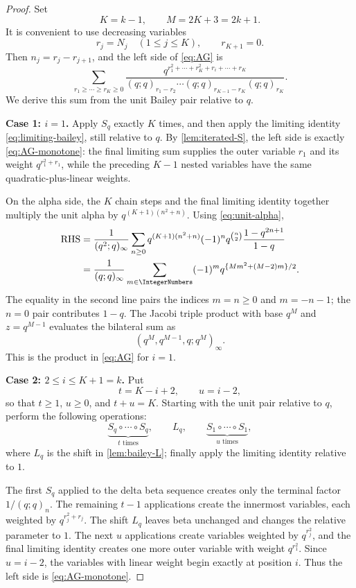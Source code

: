 \documentclass[11pt]{article}
\theoremstyle{blueplain}
\theoremstyle{bluedef}
\begin{document}
\begin{proof}
Set
\[
K=k-1,
\qquad M=2K+3=2k+1.
\]
It is convenient to use decreasing variables
\[
r_j=N_j\quad(1\le j\le K),
\qquad r_{K+1}=0.
\]
Then $n_j=r_j-r_{j+1}$, and the left side of \eqref{eq:AG} is
\begin{equation}\label{eq:AG-monotone}
\sum_{r_1\ge\cdots\ge r_K\ge0}
\frac{q^{r_1^2+\cdots+r_K^2+r_i+\cdots+r_K}}
{(q;q)_{r_1-r_2}\cdots(q;q)_{r_{K-1}-r_K}(q;q)_{r_K}}.
\end{equation}
We derive this sum from the unit Bailey pair relative to $q$.

\medskip
\noindent\textbf{Case 1: $i=1$.}
Apply $S_q$ exactly $K$ times, and then apply the limiting identity \eqref{eq:limiting-bailey}, still relative to $q$.  By \cref{lem:iterated-S}, the left side is exactly \eqref{eq:AG-monotone}: the final limiting sum supplies the outer variable $r_1$ and its weight $q^{r_1^2+r_1}$, while the preceding $K-1$ nested variables have the same quadratic-plus-linear weights.

On the alpha side, the $K$ chain steps and the final limiting identity together multiply the unit alpha by $q^{(K+1)(n^2+n)}$.  Using \eqref{eq:unit-alpha},
\begin{align*}
\text{RHS}
&=\frac1{(q^2;q)_\infty}
\sum_{n\ge0}q^{(K+1)(n^2+n)}
(-1)^nq^{\binom n2}\frac{1-q^{2n+1}}{1-q}\\
&=\frac1{(q;q)_\infty}
\sum_{m\in\IntegerNumbers}(-1)^m
q^{\{Mm^2+(M-2)m\}/2}.
\end{align*}
The equality in the second line pairs the indices $m=n\ge0$ and $m=-n-1$; the $n=0$ pair contributes $1-q$.  The Jacobi triple product with base $q^M$ and $z=q^{M-1}$ evaluates the bilateral sum as
\[
(q^M,q^{M-1},q;q^M)_\infty.
\]
This is the product in \eqref{eq:AG} for $i=1$.

\medskip
\noindent\textbf{Case 2: $2\le i\le K+1=k$.}
Put
\[
t=K-i+2,
\qquad u=i-2,
\]
so that $t\ge1$, $u\ge0$, and $t+u=K$.  Starting with the unit pair relative to $q$, perform the following operations:
\[
\underbrace{S_q\circ\cdots\circ S_q}_{t\text{ times}},
\qquad L_q,
\qquad
\underbrace{S_1\circ\cdots\circ S_1}_{u\text{ times}},
\]
where $L_q$ is the shift in \cref{lem:bailey-L}; finally apply the limiting identity relative to $1$.

The first $S_q$ applied to the delta beta sequence creates only the terminal factor $1/(q;q)_n$.  The remaining $t-1$ applications create the innermost variables, each weighted by $q^{r_j^2+r_j}$.  The shift $L_q$ leaves beta unchanged and changes the relative parameter to $1$.  The next $u$ applications create variables weighted by $q^{r_j^2}$, and the final limiting identity creates one more outer variable with weight $q^{r_1^2}$.  Since $u=i-2$, the variables with linear weight begin exactly at position $i$.  Thus the left side is \eqref{eq:AG-monotone}.


\end{proof}
\end{document}
